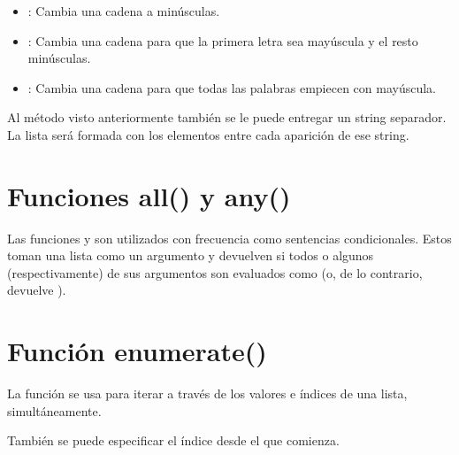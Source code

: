 \begin{itemize}

  \item {}: Cambia una cadena a minúsculas.
  

  \item {}: Cambia una cadena para que la primera letra sea mayúscula y el resto minúsculas.

  
  \item {}: Cambia una cadena para que todas las palabras empiecen con mayúscula.
  

\end{itemize}

Al método  visto anteriormente también se le puede entregar un string separador. La lista será formada con los elementos entre cada aparición de ese string.


\section{Funciones all() y any()}

Las funciones  y  son utilizados con frecuencia como sentencias condicionales. Estos toman una lista como un argumento y devuelven  si todos o algunos (respectivamente) de sus argumentos son evaluados como  (o, de lo contrario, devuelve ).




\section{Función enumerate()}

La función  se usa para iterar a través de los valores e índices de una lista, simultáneamente.


También se puede especificar el índice desde el que comienza.


\clearpage
